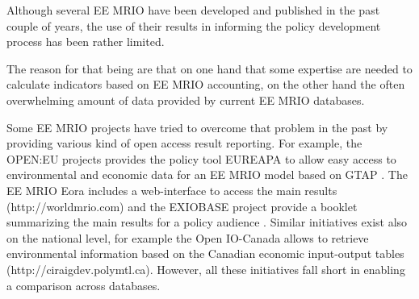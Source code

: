 Although several EE MRIO have been developed and published in the past couple of years, the use of their results in informing the policy development process has been rather limited. 

The reason for that being are that on one hand that some expertise are needed to calculate indicators based on EE MRIO accounting, on the other hand the often overwhelming amount of data provided by current EE MRIO databases.

Some EE MRIO projects have tried to overcome that problem in the past by providing various kind of open access result reporting. For example, the OPEN:EU projects provides the policy tool EUREAPA to allow easy access to environmental and economic data for an EE MRIO model based on GTAP \cite{Roelich_2014}. The EE MRIO Eora \cite{Lenzen_2013} includes a web-interface to access the main results (http://worldmrio.com) and the EXIOBASE project provide a booklet summarizing the main results for a policy audience \cite{tukker_global_2014}. Similar initiatives exist also on the national level, for example the Open IO-Canada allows to retrieve environmental information based on the Canadian economic input-output tables (http://ciraigdev.polymtl.ca). However, all these initiatives fall short in enabling a comparison across databases.  

